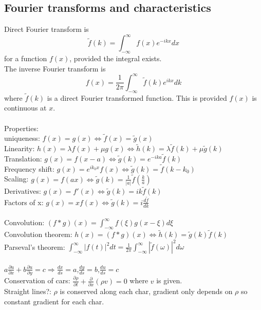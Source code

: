 \documentclass[1pt]{article}
\begin{document}
\subsection*{Fourier transforms and characteristics}
Direct Fourier transform is $$\tilde{f}(k)=\int_{-\infty}^{\infty}f(x)e^{-ikx}dx$$ for a function $f(x)$, provided the integral exists.
\\The inverse Fourier transform is $$f(x)=\frac{1}{2\pi}\int_{-\infty}^{\infty}\tilde{f}(k)e^{ikx}dk$$ where $\tilde{f}(k)$ is a direct Fourier transformed function. This is provided $f(x)$ is continuous at $x$.
\\
\\ Properties:
\\ uniqueness: $f(x)=g(x) \iff \tilde{f}(x)=\tilde{g}(x)$
\\Linearity: $h(x)=\lambda f(x) + \mu g(x) \iff \tilde{h}(k)=\lambda \tilde{f}(k) + \mu \tilde{g}(k)$
\\Translation: $g(x)=f(x-a) \iff \tilde{g}(k)=e^{-ika}\tilde{f}(k)$
\\Frequency shift: $g(x)=e^{ik_0x}f(x) \iff \tilde{g}(k)=\tilde{f}(k-k_0)$
\\Scaling: $g(x)=f(ax) \iff \tilde{g}(k)=\frac{1}{|a|}\tilde{f}(\frac{k}{a})$
\\Derivatives: $g(x)=f'(x) \iff \tilde{g}(k)=ik\tilde{f}(k)$
\\ Factors of x: $g(x)=xf(x) \iff \tilde{g}(k)=i\frac{d\tilde{f}}{dk}$
\\
\\Convolution: $(f*g)(x)=\int_{-\infty}^{\infty}f(\xi)g(x-\xi)d\xi$
\\Convolution theorem: $h(x)=(f*g)(x) \iff \tilde{h}(k)=\tilde{g}(k)\tilde{f}(k)$
\\Parseval's theorem: $\int_{-\infty}^{\infty}|f(t)|^2dt=\frac{1}{2\pi}\int_{-\infty}^{\infty}|\tilde{f}(\omega)|^2d\omega$
\\
\\$a\frac{\partial u}{\partial x}+b\frac{\partial u}{\partial y}=c \Rightarrow \frac{dx}{ds}=a$,$\frac{dy}{ds}=b$,$\frac{du}{ds}=c$
\\Conservation of cars: $\frac{\partial \rho}{\partial t}+\frac{\partial}{\partial x}(\rho v)=0$ where $v$ is given.
\\ Straight lines?: $\rho$ is conserved along each char, gradient only depends on $\rho$ so constant gradient for each char.
\end{document}
